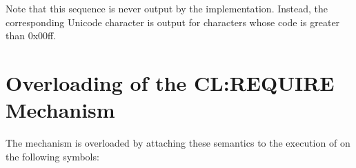 \documentclass[10pt]{book}
\begin{document}


Note that this sequence is never output by the implementation.  Instead,
the corresponding Unicode character is output for characters whose
code is greater than 0x00ff.

\section{Overloading of the CL:REQUIRE Mechanism}

The  mechanism is overloaded by attaching these
semantics to the execution of  on the following symbols:
\end{document}
